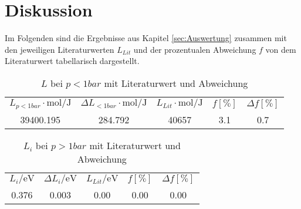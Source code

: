 \section{Diskussion}
\label{sec:Diskussion}
Im Folgenden sind die Ergebnisse aus Kapitel \ref{sec:Auswertung} zusammen mit den jeweiligen Literaturwerten
$L_{Lit}$ und der prozentualen Abweichung $f$ von dem Literaturwert tabellarisch dargestellt.
\begin{table}[H]
  \centering
      \caption{$L$ bei $p<1bar$ mit Literaturwert und Abweichung}
      \begin{tabular}{S S S S S}
        \toprule
        {$ L_{p<1bar} \cdot \si{\mole\per\joule}$} & {$ \Delta L_{<1bar} \cdot \si{\mole\per\joule}$} & {$ L_{Lit} \cdot \si{\mole\per\joule}$} & {$f [\%]$} & {$\Delta f [\%]$}\\
        39400.195 & 284.792 & 40657 & 3.1 & 0.7\\
        \bottomrule
      \end{tabular}
    \end{table}
\begin{table}[H]
  \centering
      \caption{$L_{i}$ bei $p>1bar$ mit Literaturwert und Abweichung}
      \begin{tabular}{S S S S S}
        \toprule
        {$ L_{i} / \si{\electronvolt}$} & {$ \Delta L_{i} / \si{\electronvolt}$} & {$ L_{Lit} / \si{\electronvolt}$} & {$f [\%]$} & {$\Delta f [\%]$}\\
        0.376 & 0.003 & 0.00 & 0.00 & 0.00\\
        \bottomrule
      \end{tabular}
    \end{table}

